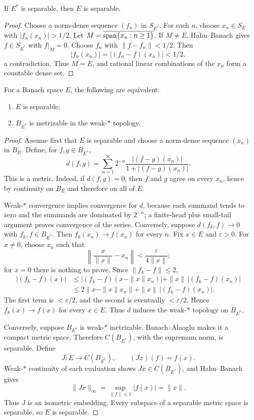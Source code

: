 \begin{notetheorem}
If $E^*$ is separable, then $E$ is separable.
\end{notetheorem}

\begin{proof}
Choose a norm-dense sequence $(f_n)$ in $S_{E^*}$.  For each $n$, choose
$x_n\in S_E$ with $|f_n(x_n)|>1/2$.  Let
$M=\overline{\operatorname{span}\{x_n:n\ge1\}}$.  If $M\ne E$, Hahn--Banach gives
$f\in S_{E^*}$ with $f|_M=0$.  Choose $f_n$ with $\|f-f_n\|<1/2$.  Then
\[
  |f_n(x_n)|=|(f_n-f)(x_n)|<1/2,
\]
a contradiction.  Thus $M=E$, and rational linear combinations of the
$x_n$ form a countable dense set.
\end{proof}

\begin{notetheorem}
For a Banach space $E$, the following are equivalent:
\begin{enumerate}
  \item $E$ is separable;
  \item $B_{E^*}$ is metrizable in the weak-$*$ topology.
\end{enumerate}
\end{notetheorem}

\begin{proof}
Assume first that $E$ is separable and choose a norm-dense sequence
$(x_n)$ in $B_E$.  Define, for $f,g\in B_{E^*}$,
\[
  d(f,g)=\sum_{n=1}^{\infty}2^{-n}
         \frac{|(f-g)(x_n)|}{1+|(f-g)(x_n)|}.
\]
This is a metric.  Indeed, if $d(f,g)=0$, then $f$ and $g$ agree on every
$x_n$, hence by continuity on $B_E$ and therefore on all of $E$.

Weak-$*$ convergence implies convergence for $d$, because each summand tends
to zero and the summands are dominated by $2^{-n}$; a finite-head plus
small-tail argument proves convergence of the series.  Conversely, suppose
$d(f_k,f)\to0$ with $f_k,f\in B_{E^*}$.  Then
$f_k(x_n)\to f(x_n)$ for every $n$.  Fix $x\in E$ and $\varepsilon>0$.
For $x\ne0$, choose $x_n$ such that
\[
  \left\|\frac{x}{\|x\|}-x_n\right\|
  <\frac{\varepsilon}{4\|x\|};
\]
for $x=0$ there is nothing to prove.  Since
$\|f_k-f\|\le2$,
\[
\begin{aligned}
  |(f_k-f)(x)|
   &\le |(f_k-f)(x-\|x\|x_n)|
      +\|x\|\,|(f_k-f)(x_n)|\\
   &\le 2\|x-\|x\|x_n\|
      +\|x\|\,|(f_k-f)(x_n)|.
\end{aligned}
\]
The first term is $<\varepsilon/2$, and the second is eventually
$<\varepsilon/2$.  Hence $f_k(x)\to f(x)$ for every $x\in E$.  Thus $d$
induces the weak-$*$ topology on $B_{E^*}$.

Conversely, suppose $B_{E^*}$ is weak-$*$ metrizable.  Banach--Alaoglu makes
it a compact metric space.  Therefore $C(B_{E^*})$, with the supremum norm,
is separable.  Define
\[
  J\colon E\to C(B_{E^*}),
  \qquad
  (Jx)(f)=f(x).
\]
Weak-$*$ continuity of each evaluation shows $Jx\in C(B_{E^*})$, and
Hahn--Banach gives
\[
  \|Jx\|_\infty
  =\sup_{\|f\|\le1}|f(x)|
  =\|x\|.
\]
Thus $J$ is an isometric embedding.  Every subspace of a separable metric
space is separable, so $E$ is separable.
\end{proof}

